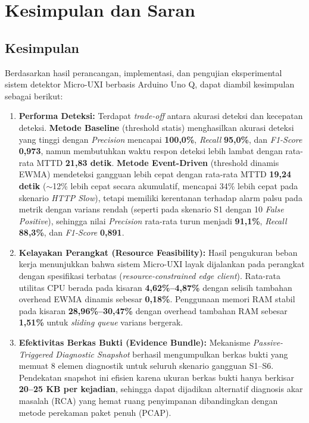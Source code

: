 \section{Kesimpulan dan Saran}
\label{sec-kesimpulan-dan-saran}

\subsection{Kesimpulan}

Berdasarkan hasil perancangan, implementasi, dan pengujian eksperimental sistem detektor Micro-UXI berbasis Arduino Uno Q, dapat diambil kesimpulan sebagai berikut:

\begin{enumerate}
    \item \textbf{Performa Deteksi:} Terdapat \textit{trade-off} antara akurasi deteksi dan kecepatan deteksi. \textbf{Metode Baseline} (threshold statis) menghasilkan akurasi deteksi yang tinggi dengan \textit{Precision} mencapai \textbf{100,0\%}, \textit{Recall} \textbf{95,0\%}, dan \textit{F1-Score} \textbf{0,973}, namun membutuhkan waktu respon deteksi lebih lambat dengan rata-rata MTTD \textbf{21,83 detik}. \textbf{Metode Event-Driven} (threshold dinamis EWMA) mendeteksi gangguan lebih cepat dengan rata-rata MTTD \textbf{19,24 detik} ($\sim$12\% lebih cepat secara akumulatif, mencapai 34\% lebih cepat pada skenario \textit{HTTP Slow}), tetapi memiliki kerentanan terhadap alarm palsu pada metrik dengan varians rendah (seperti pada skenario S1 dengan 10 \textit{False Positive}), sehingga nilai \textit{Precision} rata-rata turun menjadi \textbf{91,1\%}, \textit{Recall} \textbf{88,3\%}, dan \textit{F1-Score} \textbf{0,891}.
    \item \textbf{Kelayakan Perangkat (Resource Feasibility):} Hasil pengukuran beban kerja menunjukkan bahwa sistem Micro-UXI layak dijalankan pada perangkat dengan spesifikasi terbatas (\textit{resource-constrained edge client}). Rata-rata utilitas CPU berada pada kisaran \textbf{4,62\%--4,87\%} dengan selisih tambahan overhead EWMA dinamis sebesar \textbf{0,18\%}. Penggunaan memori RAM stabil pada kisaran \textbf{28,96\%--30,47\%} dengan overhead tambahan RAM sebesar \textbf{1,51\%} untuk \textit{sliding queue} varians bergerak.
    \item \textbf{Efektivitas Berkas Bukti (Evidence Bundle):} Mekanisme \textit{Passive-Triggered Diagnostic Snapshot} berhasil mengumpulkan berkas bukti yang memuat 8 elemen diagnostik untuk seluruh skenario gangguan S1--S6. Pendekatan snapshot ini efisien karena ukuran berkas bukti hanya berkisar \textbf{20--25 KB per kejadian}, sehingga dapat dijadikan alternatif diagnosis akar masalah (RCA) yang hemat ruang penyimpanan dibandingkan dengan metode perekaman paket penuh (PCAP).
\end{enumerate}

